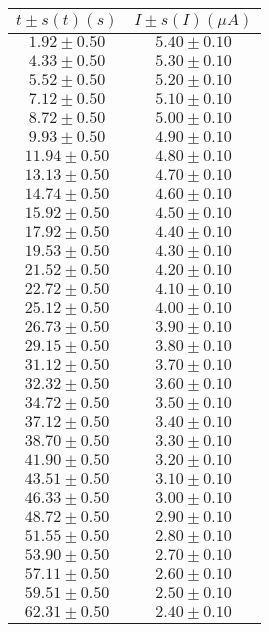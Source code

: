 \begin{table}[H]
\centering
\setlength{\arrayrulewidth}{1.2pt}
\begin{tabular}{|c|c|}
\hline
$t \pm s(t) (s)$ & $I \pm s(I) (\mu A)$ \\
\hline
$1.92 \pm 0.50$ & $5.40 \pm 0.10$ \\
$4.33 \pm 0.50$ & $5.30 \pm 0.10$ \\
$5.52 \pm 0.50$ & $5.20 \pm 0.10$ \\
$7.12 \pm 0.50$ & $5.10 \pm 0.10$ \\
$8.72 \pm 0.50$ & $5.00 \pm 0.10$ \\
$9.93 \pm 0.50$ & $4.90 \pm 0.10$ \\
$11.94 \pm 0.50$ & $4.80 \pm 0.10$ \\
$13.13 \pm 0.50$ & $4.70 \pm 0.10$ \\
$14.74 \pm 0.50$ & $4.60 \pm 0.10$ \\
$15.92 \pm 0.50$ & $4.50 \pm 0.10$ \\
$17.92 \pm 0.50$ & $4.40 \pm 0.10$ \\
$19.53 \pm 0.50$ & $4.30 \pm 0.10$ \\
$21.52 \pm 0.50$ & $4.20 \pm 0.10$ \\
$22.72 \pm 0.50$ & $4.10 \pm 0.10$ \\
$25.12 \pm 0.50$ & $4.00 \pm 0.10$ \\
$26.73 \pm 0.50$ & $3.90 \pm 0.10$ \\
$29.15 \pm 0.50$ & $3.80 \pm 0.10$ \\
$31.12 \pm 0.50$ & $3.70 \pm 0.10$ \\
$32.32 \pm 0.50$ & $3.60 \pm 0.10$ \\
$34.72 \pm 0.50$ & $3.50 \pm 0.10$ \\
$37.12 \pm 0.50$ & $3.40 \pm 0.10$ \\
$38.70 \pm 0.50$ & $3.30 \pm 0.10$ \\
$41.90 \pm 0.50$ & $3.20 \pm 0.10$ \\
$43.51 \pm 0.50$ & $3.10 \pm 0.10$ \\
$46.33 \pm 0.50$ & $3.00 \pm 0.10$ \\
$48.72 \pm 0.50$ & $2.90 \pm 0.10$ \\
$51.55 \pm 0.50$ & $2.80 \pm 0.10$ \\
$53.90 \pm 0.50$ & $2.70 \pm 0.10$ \\
$57.11 \pm 0.50$ & $2.60 \pm 0.10$ \\
$59.51 \pm 0.50$ & $2.50 \pm 0.10$ \\
$62.31 \pm 0.50$ & $2.40 \pm 0.10$ \\

\end{tabular}
\end{table}
